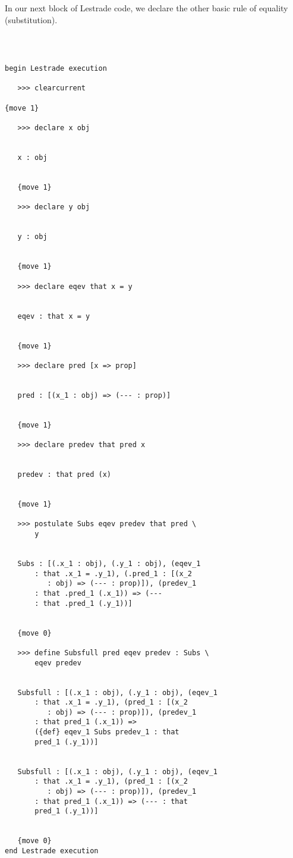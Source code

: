 \documentclass{slides}
\begin{document}
\begin{slide}

In our next block of Lestrade code, we declare the other basic rule of equality (substitution).
{\tiny
\begin{verbatim}



begin Lestrade execution

   >>> clearcurrent

{move 1}

   >>> declare x obj


   x : obj


   {move 1}

   >>> declare y obj


   y : obj


   {move 1}

   >>> declare eqev that x = y


   eqev : that x = y


   {move 1}

   >>> declare pred [x => prop]


   pred : [(x_1 : obj) => (--- : prop)]


   {move 1}

   >>> declare predev that pred x


   predev : that pred (x)


   {move 1}

   >>> postulate Subs eqev predev that pred \
       y


   Subs : [(.x_1 : obj), (.y_1 : obj), (eqev_1 
       : that .x_1 = .y_1), (.pred_1 : [(x_2 
          : obj) => (--- : prop)]), (predev_1 
       : that .pred_1 (.x_1)) => (--- 
       : that .pred_1 (.y_1))]


   {move 0}

   >>> define Subsfull pred eqev predev : Subs \
       eqev predev


   Subsfull : [(.x_1 : obj), (.y_1 : obj), (eqev_1 
       : that .x_1 = .y_1), (pred_1 : [(x_2 
          : obj) => (--- : prop)]), (predev_1 
       : that pred_1 (.x_1)) => 
       ({def} eqev_1 Subs predev_1 : that 
       pred_1 (.y_1))]


   Subsfull : [(.x_1 : obj), (.y_1 : obj), (eqev_1 
       : that .x_1 = .y_1), (pred_1 : [(x_2 
          : obj) => (--- : prop)]), (predev_1 
       : that pred_1 (.x_1)) => (--- : that 
       pred_1 (.y_1))]


   {move 0}
end Lestrade execution
\end{verbatim}
}
\end{slide}
\end{document}
